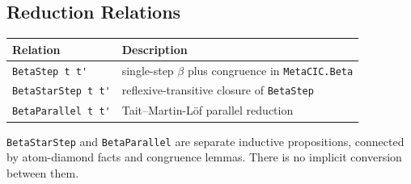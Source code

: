 \subsection{Reduction Relations}\label{subsec:reconstruction-reduction-table}

\begin{center}
\begin{tabular}{l l}
\hline
Relation & Description \\
\hline
\verb|BetaStep t t'| & single-step $\beta$ plus congruence in \texttt{MetaCIC.Beta} \\
\verb|BetaStarStep t t'| & reflexive-transitive closure of \texttt{BetaStep} \\
\verb|BetaParallel t t'| & Tait--Martin-L\"of parallel reduction \\
\hline
\end{tabular}
\end{center}

\verb|BetaStarStep| and \verb|BetaParallel| are separate inductive
propositions, connected by atom-diamond facts and congruence lemmas. There is
no implicit conversion between them.
